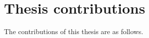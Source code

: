\section{Thesis contributions}
\label{sec:contribution}

The contributions of this thesis are as follows.

